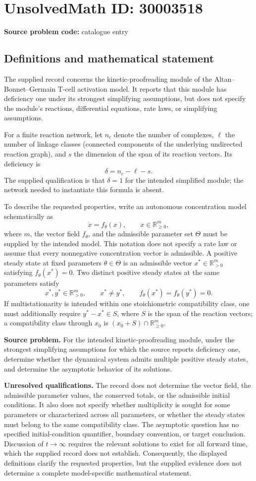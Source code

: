 \documentclass[11pt]{article}
\newcommand{\R}{\mathbb{R}}
\begin{document}
\section*{UnsolvedMath ID: 30003518}
\textbf{Source problem code:} catalogue entry
\subsection{Definitions and mathematical statement}
The supplied record concerns the kinetic-proofreading module of the Altan--Bonnet--Germain T-cell activation model. It reports that this module has deficiency one under its strongest simplifying assumptions, but does not specify the module's reactions, differential equations, rate laws, or simplifying assumptions.

For a finite reaction network, let \(n_c\) denote the number of complexes, \(\ell\) the number of linkage classes (connected components of the underlying undirected reaction graph), and \(s\) the dimension of the span of its reaction vectors. Its deficiency is
\[
\delta=n_c-\ell-s.
\]
The supplied qualification is that \(\delta=1\) for the intended simplified module; the network needed to instantiate this formula is absent.

To describe the requested properties, write an autonomous concentration model schematically as
\[
\dot{x}=f_\theta(x),\qquad x\in\R_{\geq 0}^{m},
\]
where \(m\), the vector field \(f_\theta\), and the admissible parameter set \(\Theta\) must be supplied by the intended model. This notation does not specify a rate law or assume that every nonnegative concentration vector is admissible. A positive steady state at fixed parameters \(\theta\in\Theta\) is an admissible vector \(x^*\in\R_{>0}^{m}\) satisfying \(f_\theta(x^*)=0\). Two distinct positive steady states at the same parameters satisfy
\[
x^*,y^*\in\R_{>0}^{m},\qquad x^*\ne y^*,\qquad f_\theta(x^*)=f_\theta(y^*)=0.
\]
If multistationarity is intended within one stoichiometric compatibility class, one must additionally require \(y^*-x^*\in S\), where \(S\) is the span of the reaction vectors; a compatibility class through \(x_0\) is \((x_0+S)\cap\R_{\geq0}^{m}\).

\textbf{Source problem.} For the intended kinetic-proofreading module, under the strongest simplifying assumptions for which the source reports deficiency one, determine whether the dynamical system admits multiple positive steady states, and determine the asymptotic behavior of its solutions.

\textbf{Unresolved qualifications.} The record does not determine the vector field, the admissible parameter values, the conserved totals, or the admissible initial conditions. It also does not specify whether multiplicity is sought for some parameters or characterized across all parameters, or whether the steady states must belong to the same compatibility class. The asymptotic question has no specified initial-condition quantifier, boundary convention, or target conclusion. Discussion of \(t\to\infty\) requires the relevant solutions to exist for all forward time, which the supplied record does not establish. Consequently, the displayed definitions clarify the requested properties, but the supplied evidence does not determine a complete model-specific mathematical statement.
\end{document}
